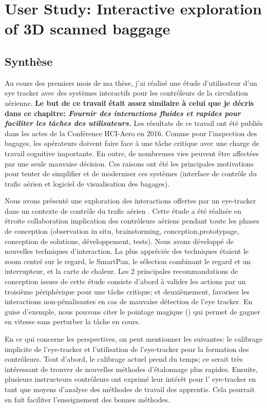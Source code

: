 \chapter{User Study: Interactive exploration of 3D scanned baggage} %
\label{DesignStudy}

\section{Synthèse}
Au cours des premiers mois de ma thèse, j'ai réalisé une étude d'utilisateur d'un eye tracker avec des systèmes interactifs pour les contrôleurs de la circulation aérienne. \textbf{Le but de ce travail était assez similaire à celui que je décris dans ce chapitre: \textit{Fournir des interactions fluides et rapides pour faciliter les tâches des utilisateurs.}} Les résultats de ce travail ont été publiés dans les actes de la Conférence HCI-Aero en 2016. Comme pour l'inspection des bagages, les opérateurs doivent faire face à une tâche critique avec une charge de travail cognitive importante. En outre, de nombreuses vies peuvent être affectées par une seule mauvaise décision. Ces raisons ont été les principales motivations pour tenter de simplifier et de moderniser ces systèmes (interface de contrôle du trafic aérien et logiciel de visualisation des bagages).


Nous avons présenté une exploration des interactions
offertes par un eye-tracker dans un contexte de contrôle du trafic aérien
. Cette étude a été réalisée en étroite collaboration
implication des contrôleurs aériens pendant toute les phases de conception
(observation in situ, brainstorming, conception,prototypage, conception de solutions, développement, tests). Nous avons développé de nouvelles techniques d'interaction. La plus appréciée
des techniques étaient le zoom centré sur le regard, le SmartPan, le
sélection combinant le regard et un interrupteur, et la carte de chaleur. Les 2 principales recommandations de conception issues de cette étude consiste d'abord à valider les actions par un troisième périphérique
pour une  tâche critique; et deuxièmement, favoriser les interactions non-pénalisantes
en cas de mauvaise détection de l'eye tracker. En guise d'exemple, nous pouvons citer le pointage magique (\cite{Zhai:1999:MGI:302979.303053}) qui permet de gagner en vitesse sans perturber la tâche en cours.

En ce qui concerne les perspectives, on peut mentionner les suivantes:
le calibrage implicite de l'eye-tracker et l'utilisation de l'eye-tracker pour la formation des contrôleurs. Tout d'abord, le calibrage actuel prend du temps; ce serait très intéressant de trouver de
nouvelles méthodes d'étalonnage plus rapides. Ensuite, plusieurs instructeurs
contrôleurs ont exprimé leur intérêt pour l' eye-tracker en tant que
moyens d'analyse des méthodes de travail des apprentis. Cela pourrait en fait faciliter l'enseignement des bonnes méthodes. 



